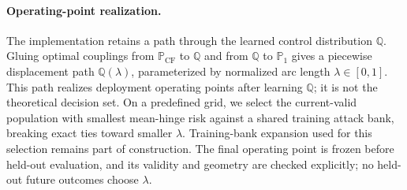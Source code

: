 \paragraph{Operating-point realization.}
The implementation retains a path through the learned control distribution $\mathbb Q$.
Gluing optimal couplings from $\mathbb P_{\mathrm{CF}}$ to $\mathbb Q$ and from $\mathbb Q$ to $\mathbb P_1$ gives a piecewise displacement path $\mathbb Q(\lambda)$, parameterized by normalized arc length $\lambda\in[0,1]$.
This path realizes deployment operating points after learning $\mathbb Q$; it is not the theoretical decision set.
On a predefined grid, we select the current-valid population with smallest mean-hinge risk against a shared training attack bank, breaking exact ties toward smaller $\lambda$.
Training-bank expansion used for this selection remains part of construction.
The final operating point is frozen before held-out evaluation, and its validity and geometry are checked explicitly; no held-out future outcomes choose $\lambda$.


